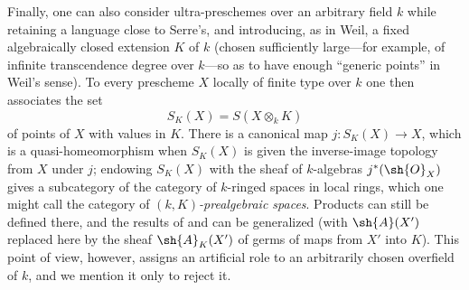 \begin{env}[10.10.5]
\label{IV.10.10.5}
Finally, one can also consider ultra-preschemes over an arbitrary field $k$ while
retaining a language close to Serre's, and introducing, as in Weil, a fixed
algebraically closed extension $K$ of $k$ (chosen sufficiently large---for example,
of infinite transcendence degree over $k$---so as to have enough ``generic points''
in Weil's sense).
To every prescheme $X$ locally of finite type over $k$ one then associates the set
\[
 S_K(X)=S(X\otimes_k K)
\]
of points of $X$ with values in $K$.
There is a canonical map $j:S_K(X)\to X$, which is a quasi-homeomorphism when
$S_K(X)$ is given the inverse-image topology from $X$ under $j$; endowing $S_K(X)$
with the sheaf of $k$-algebras $j^*(\sh{O}_X)$ gives a subcategory of the category
of $k$-ringed spaces in local rings, which one might call the category of
\emph{$(k,K)$-prealgebraic spaces}.
Products can still be defined there, and the results of  and
 can be generalized (with $\sh{A}(X')$ replaced here by the sheaf
$\sh{A}_K(X')$ of germs of maps from $X'$ into $K$).
This point of view, however, assigns an artificial role to an arbitrarily chosen
overfield of $k$, and we mention it only to reject it.
\end{env}
